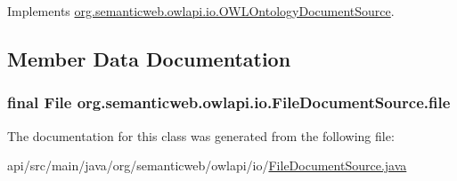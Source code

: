 Implements \hyperlink{interfaceorg_1_1semanticweb_1_1owlapi_1_1io_1_1_o_w_l_ontology_document_source_afde55562eda873b241b32ef90f2b66c6}{org.\-semanticweb.\-owlapi.\-io.\-O\-W\-L\-Ontology\-Document\-Source}.



\subsection{Member Data Documentation}
\hypertarget{classorg_1_1semanticweb_1_1owlapi_1_1io_1_1_file_document_source_a17df38947bfac25526f71a6f3a6b43a6}{
\subsubsection[{file}]{\setlength{\rightskip}{0pt plus 5cm}final File org.\-semanticweb.\-owlapi.\-io.\-File\-Document\-Source.\-file\hspace{0.3cm}{\ttfamily [private]}}}\label{classorg_1_1semanticweb_1_1owlapi_1_1io_1_1_file_document_source_a17df38947bfac25526f71a6f3a6b43a6}


The documentation for this class was generated from the following file\-:\begin{DoxyCompactItemize}
\item 
api/src/main/java/org/semanticweb/owlapi/io/\hyperlink{_file_document_source_8java}{File\-Document\-Source.\-java}\end{DoxyCompactItemize}
